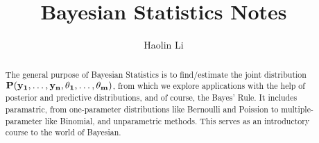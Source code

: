 \documentclass[a4paper]{report}
\author{Haolin Li}
\title{Bayesian Statistics Notes}
\begin{document}
\maketitle

\begin{abstract}
	The general purpose of Bayesian Statistics is to find/estimate the joint distribution $\bf{P}(y_1, \ldots, y_n, \theta_1, \ldots, \theta_m)$, from which we explore applications with the help of posterior and predictive distributions, and of course, the Bayes' Rule. It includes paramatric, from one-parameter distributions like Bernoulli and Poission to multiple-parameter like Binomial, and unparametric methods. This serves as an introductory course to the world of Bayesian.
\end{abstract}

\newpage

\tableofcontents

\newpage



\appendix
\appendixpage


\end{document}
